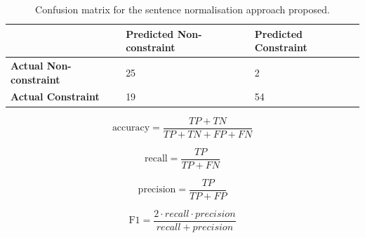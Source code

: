 \begin{table}[]
	\begin{tabular}{l|l|l|}
		\cline{2-3}
		& \textbf{Predicted Non-constraint} & \textbf{Predicted Constraint} \\ \hline
		\multicolumn{1}{|l|}{\textbf{Actual Non-constraint}} & 25 & 2 \\ \hline
		\multicolumn{1}{|l|}{\textbf{Actual Constraint}} & 19 & 54 \\ \hline
	\end{tabular}
	\caption{Confusion matrix for the sentence normalisation approach proposed.}
	\label{tab:conf-mat}
\end{table}

\begin{equation}
\label{accuracy}
\text{accuracy} = \frac{TP + TN}{TP + TN + FP + FN}
\end{equation}

\begin{equation}
\label{recall}
\text{recall}=\frac{TP}{TP + FN}
\end{equation}

\begin{equation}
\label{precision}
\text{precision}=\frac{TP}{TP + FP}
\end{equation}

\begin{equation}
\label{f-measure}
\text{F1}=\frac{2\cdot recall\cdot precision}{recall + precision}
\end{equation}

